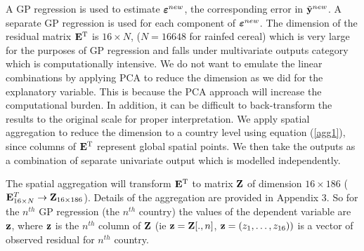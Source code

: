 A GP regression is used to estimate ${\boldsymbol{\varepsilon}}^{new}$, the corresponding error in ${\tilde {\bf y}}^{new}$. A separate GP regression is used for each component of ${\boldsymbol{\varepsilon}}^{new}$. The dimension of the residual matrix ${\bf E}^{\rm T}$ is $16 \times N$, ($N=16648$ for rainfed cereal) which is very large for the purposes of GP regression and falls under multivariate outputs category which is computationally intensive. We do not want to emulate the linear combinations by applying PCA to reduce the dimension as we did for the explanatory variable. This is because the PCA approach will increase the computational burden. In addition, it can be difficult to back-transform the results to the original scale for proper interpretation. We apply spatial aggregation to reduce the dimension to a country level using equation (\ref{agg1}), since columns of ${\bf E}^{\rm T}$ represent global spatial points. We then take the outputs as a combination of separate univariate output which is modelled independently.

The spatial aggregation will transform ${\bf E}^{\rm T}$ to matrix $\bf Z$ of dimension $16\times 186$ (${\bf E}_{16\times N}^T\rightarrow {\bf Z}_{16\times 186}$). Details of the aggregation are provided in Appendix 3.
So for the $n^{th}$ GP regression (the $n^{th}$ country) the values of the dependent variable are ${\bf z}$, where ${\bf z}$ is the $n^{th}$ column of ${\bf Z}$ (ie ${\bf z}={\bf Z}{[.,n]}$, ${\bf z}=(z_1,\ldots,z_{16}))$ is a vector of observed residual for $n^{th}$ country.

